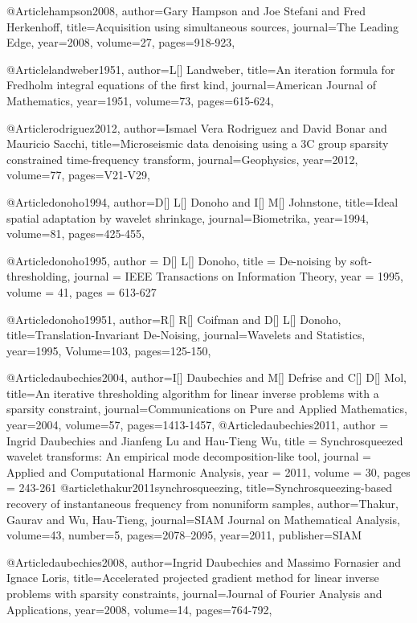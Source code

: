 @Article{hampson2008,
  author={Gary Hampson and Joe Stefani and Fred Herkenhoff},
  title={Acquisition using simultaneous sources},
  journal={The Leading Edge},
  year=2008,
  volume=27,
  pages={918-923},
}

@Article{landweber1951,
  author={L[] Landweber},
  title={An iteration formula for Fredholm integral equations of the first kind},
  journal={American Journal of Mathematics},
  year=1951,
  volume=73,
  pages={615-624},
}

@Article{rodriguez2012,
  author={Ismael Vera Rodriguez and David Bonar and Mauricio Sacchi},
  title={Microseismic data denoising using a 3C group sparsity constrained time-frequency transform},
  journal={Geophysics},
  year=2012,
  volume=77,
  pages={V21-V29},
}

@Article{donoho1994,
  author={D[] L[] Donoho and I[] M[] Johnstone},
  title={Ideal spatial adaptation by wavelet shrinkage},
  journal={Biometrika},
  year=1994,
  volume=81,
  pages={425-455},
}

@Article{donoho1995,
  author =  {D[] L[] Donoho},
  title =   {De-noising by soft-thresholding},
  journal = {IEEE Transactions on Information Theory},
  year =    {1995},
  volume =  {41},
  pages =   {613-627}
}


@Article{donoho19951,
  author={R[] R[] Coifman and D[] L[] Donoho},
  title={Translation-Invariant De-Noising},
  journal={Wavelets and Statistics},
  year=1995,
  Volume=103,
  pages={125-150},
}

@Article{daubechies2004,
  author={I[] Daubechies and M[] Defrise and C[] D[] Mol},
  title={An iterative thresholding algorithm for linear inverse problems with a sparsity constraint},
  journal={Communications on Pure and Applied Mathematics},
  year=2004,
  volume=57,
  pages={1413-1457},
}
@Article{daubechies2011,
  author = 	 {Ingrid Daubechies and Jianfeng Lu and Hau-Tieng Wu},
  title = 	 {Synchrosqueezed wavelet transforms: An empirical mode decomposition-like tool},
  journal = 	 {Applied and Computational Harmonic Analysis},
  year = 	 2011,
  volume = 	 30,
  pages = 	 {243-261}
}
@article{thakur2011synchrosqueezing,
  title={Synchrosqueezing-based recovery of instantaneous frequency from nonuniform samples},
  author={Thakur, Gaurav and Wu, Hau-Tieng},
  journal={SIAM Journal on Mathematical Analysis},
  volume={43},
  number={5},
  pages={2078--2095},
  year={2011},
  publisher={SIAM}
}


@Article{daubechies2008,
  author={Ingrid Daubechies and Massimo Fornasier and Ignace Loris},
  title={Accelerated projected gradient method for linear inverse problems with sparsity constraints},
  journal={Journal of {F}ourier Analysis and Applications},
  year=2008,
  volume=14,
  pages={764-792},
}


